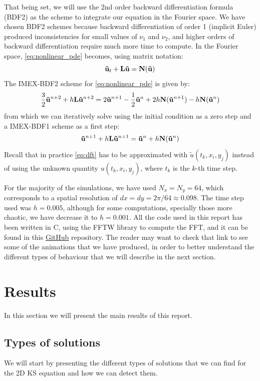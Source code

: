 \documentclass[twoside]{article}
\begin{document}
That being set, we will use the 2nd order backward differentiation formula (BDF2) as the scheme to integrate our equation in the Fourier space. We have chosen BDF2 schemes because backward differentiation of order 1 (implicit Euler) produced inconsistencies for small values of $\nu_1$ and $\nu_2$, and higher orders of backward differentiation require much more time to compute. In the Fourier space, \cref{eq:nonlinear_pde} becomes, using matrix notation:
\begin{equation}
  \boldsymbol{\mathrm{\tilde{u}}}_t+\boldsymbol{\mathrm{L}}\boldsymbol{\mathrm{\tilde{u}}}=\boldsymbol{\mathrm{N}}(\boldsymbol{\mathrm{\tilde{u}}})
\end{equation}
The IMEX-BDF2 scheme for \cref{eq:nonlinear_pde} is given by:
\begin{equation}
  \frac{3}{2} \boldsymbol{\mathrm{\tilde{u}}}^{n+2} +h \boldsymbol{\mathrm{L}} \boldsymbol{\mathrm{\tilde{u}}}^{n+2} = 2 \boldsymbol{\mathrm{\tilde{u}}}^{n+1} - \frac{1}{2} \boldsymbol{\mathrm{\tilde{u}}}^{n} + 2h \boldsymbol{\mathrm{N}}(\boldsymbol{\mathrm{\tilde{u}}}^{n+1}) -  h \boldsymbol{\mathrm{N}}(\boldsymbol{\mathrm{\tilde{u}}}^{n})
\end{equation}
from which we can iteratively solve using the initial condition as a zero step and a IMEX-BDF1 scheme as a first step:
\begin{equation}
  \boldsymbol{\mathrm{\tilde{u}}}^{n+1} + h \boldsymbol{\mathrm{L}} \boldsymbol{\mathrm{\tilde{u}}}^{n+1} = \boldsymbol{\mathrm{\tilde{u}}}^{n} + h \boldsymbol{\mathrm{N}}(\boldsymbol{\mathrm{\tilde{u}}}^{n})
\end{equation}
Recall that in practice \cref{eq:dft} has to be approximated with $\tilde{u}(t_k,x_i,y_j)$ instead of using the unknown quantity $u(t_k,x_i,y_j)$, where $t_k$ is the $k$-th time step.

For the majority of the simulations, we have used $N_x=N_y=64$, which corresponds to a spatial resolution of $dx=dy=2\pi/64\approx 0.098$. The time step used was $h=0.005$, although for some computations, specially those more chaotic, we have decrease it to $h=0.001$. All the code used in this report has been written in C, using the FFTW library \cite{fftw} to compute the FFT, and it can be found in this \href{https://github.com/victorballester7/2d-kuramoto-sivashinsky}{GitHub} repository. The reader may want to check that link to see some of the animations that we have produced, in order to better understand the different types of behaviour that we will describe in the next section.

\section{Results}
In this section we will present the main results of this report.
\subsection{Types of solutions}\label{sec:types_of_solutions}
We will start by presenting the different types of solutions that we can find for the 2D KS equation and how we can detect them.
\end{document}
